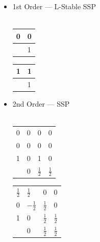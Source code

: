 \documentclass[10pt]{beamer}
\begin{document}
      \begin{frame}
        \begin{itemize}
          \item 1st Order --- L-Stable SSP \hfill \\ \hfill \\
            \begin{tabular}{r|l}
              0 & 0 \\
              \midrule
                & 1
            \end{tabular}\hspace{0.5cm}
            \begin{tabular}{r|l}
              1 & 1 \\
              \midrule
                & 1
            \end{tabular}

          \vspace{0.5cm}

          \item 2nd Order --- SSP \hfill \\ \hfill \\
            \begin{tabular}{r|lll}
              0 & 0 & 0 & 0 \\
              0 & 0 & 0 & 0 \\
              1 & 0 & 1 & 0 \\
              \midrule
                & 0 & \(\frac{1}{2}\) & \(\frac{1}{2}\) \\
            \end{tabular}\hspace{0.5cm}
            \begin{tabular}{r|lll}
              \(\frac{1}{2}\) & \(\frac{1}{2}\) & 0 & 0 \\
              0 & \(-\frac{1}{2}\) & \(\frac{1}{2}\) & 0 \\
              1 & 0 & \(\frac{1}{2}\) & \(\frac{1}{2}\) \\
              \midrule
                & 0 & \(\frac{1}{2}\) & \(\frac{1}{2}\) \\
            \end{tabular}
        \end{itemize}
      \end{frame}
\end{document}
